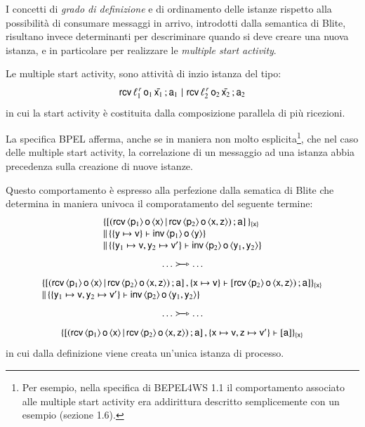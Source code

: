 I concetti di \emph{grado di definizione} e di ordinamento delle istanze
rispetto alla possibilità di consumare messaggi in arrivo, introdotti dalla
semantica di Blite, risultano invece determinanti per descriminare quando si
deve creare una nuova istanza, e in particolare per realizzare le \emph{multiple
start activity}.

Le multiple start activity, sono attività di inzio istanza del tipo:
$$
	{\sf rcv}\,\ell^{\,r}_1\, {\sf o}_1\, \bar{{\sf x}_1} \, ; {\sf a}_1 
	\, \,|\, \, 
	{\sf rcv}\,\ell^{\,r}_2\, {\sf o}_2\, \bar{{\sf x}_2} \, ; {\sf a}_2
$$
in cui la start activity è costituita dalla composizione parallela di più
ricezioni. 

La specifica BPEL afferma, anche se in maniera non molto esplicita\footnote{Per
esempio, nella specifica di BEPEL4WS 1.1 \cite{BPEL11Spec} il comportamento
associato alle multiple start activity era addirittura descritto semplicemente
con un esempio (sezione 1.6).}, che nel caso delle multiple start activity, la
correlazione di un messaggio ad una istanza abbia precedenza sulla creazione di
nuove istanze.

Questo comportamento è espresso alla perfezione dalla sematica di Blite che
determina in maniera univoca il comporatamento del seguente termine:\\
$$
\begin{array}{l}
\{
[ ({\sf rcv}\,\langle {\sf p}_1 \rangle\, {\sf o}\, \langle {\sf x} \rangle
	 \,|\,  {\sf rcv}\,\langle {\sf p}_2 \rangle\, {\sf o}\, \langle {\sf x}, {\sf z} \rangle) 
	 \, ; {\sf a}]
\,\}_{\{{\sf x}\}}
\\ 
\|\, 
\{
\{{\sf y} \mapsto {\sf v}\} \vdash {\sf inv}\,\langle {\sf p}_1 \rangle\,{\sf o}\,\langle {\sf y} \rangle
\}
\\
\|\, 
\{
\{{\sf y}_1 \mapsto {\sf v},
{\sf y}_2 \mapsto {\sf v}'\} \vdash {\sf inv}\,\langle {\sf p}_2 \rangle\,{\sf o}\,\langle {\sf y}_1, {\sf y}_2 \rangle
\}
\end{array}
$$
$$
\begin{array}{c}
\ldots \bpelredarrow{} \ldots
\end{array}
$$
$$
\begin{array}{l}
\{
[ ({\sf rcv}\,\langle {\sf p}_1 \rangle\, {\sf o}\, \langle {\sf x} \rangle
	 \,|\,  {\sf rcv}\,\langle {\sf p}_2 \rangle\, {\sf o}\, \langle {\sf x}, {\sf z} \rangle) 
	 \, ; {\sf a}]
\, , 
\{{\sf x} \mapsto {\sf v}\} \vdash  
	[{\sf rcv}\,\langle {\sf p}_2 \rangle\, {\sf o}\, \langle {\sf x}, {\sf z} \rangle)
	\, ; {\sf a} ] 
\}_{\{{\sf x}\}}
\\
\|\, 
\{
\{{\sf y}_1 \mapsto {\sf v},
{\sf y}_2 \mapsto {\sf v}'\} \vdash {\sf inv}\,\langle {\sf p}_2 \rangle\,{\sf o}\,\langle {\sf y}_1, {\sf y}_2 \rangle
\}
\end{array}
$$
$$
\begin{array}{c}
\ldots \bpelredarrow{} \ldots
\end{array}
$$
$$
\begin{array}{l}
\{
[ ({\sf rcv}\,\langle {\sf p}_1 \rangle\, {\sf o}\, \langle {\sf x} \rangle
	 \,|\,  {\sf rcv}\,\langle {\sf p}_2 \rangle\, {\sf o}\, \langle {\sf x}, {\sf z} \rangle) 
	 \, ; {\sf a}]
\, , 
\{{\sf x} \mapsto {\sf v}, {\sf z} \mapsto {\sf v}'\} \vdash  
[{\sf a}]  
\}_{\{{\sf x}\}}
\end{array}
$$
in cui dalla definizione viene creata un'unica istanza di processo.

